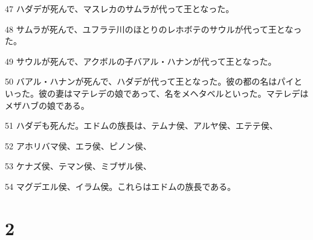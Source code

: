 \par 47 ハダデが死んで、マスレカのサムラが代って王となった。
\par 48 サムラが死んで、ユフラテ川のほとりのレホボテのサウルが代って王となった。
\par 49 サウルが死んで、アクボルの子バアル・ハナンが代って王となった。
\par 50 バアル・ハナンが死んで、ハダデが代って王となった。彼の都の名はパイといった。彼の妻はマテレデの娘であって、名をメヘタベルといった。マテレデはメザハブの娘である。
\par 51 ハダデも死んだ。エドムの族長は、テムナ侯、アルヤ侯、エテテ侯、
\par 52 アホリバマ侯、エラ侯、ピノン侯、
\par 53 ケナズ侯、テマン侯、ミブザル侯、
\par 54 マグデエル侯、イラム侯。これらはエドムの族長である。

\chapter{2}

